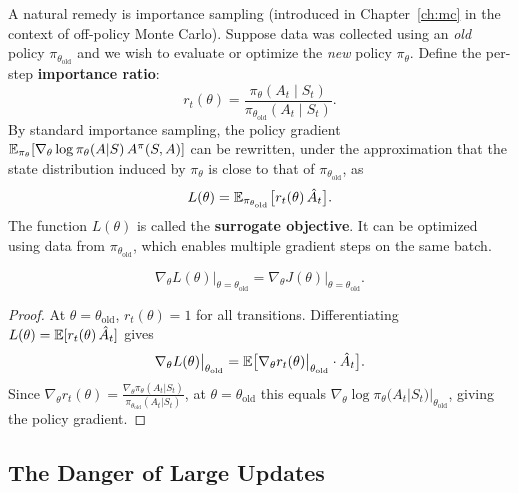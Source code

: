A natural remedy is importance sampling (introduced in Chapter~\ref{ch:mc}
in the context of off-policy Monte Carlo).  Suppose data was collected using
an \emph{old} policy $\pi_{\theta_\mathrm{old}}$ and we wish to evaluate or
optimize the \emph{new} policy $\pi_\theta$.  Define the per-step
\textbf{importance ratio}:
\begin{equation}
\label{eq:importance-ratio}
r_t(\theta)
= \frac{\pi_\theta(A_t \mid S_t)}{\pi_{\theta_\mathrm{old}}(A_t \mid S_t)}.
\end{equation}
By standard importance sampling, the policy gradient
$\operatorname{\mathbb{E}}_{\pi_\theta}[\nabla_\theta \log\pi_\theta(A|S)\,A^\pi(S,A)]$ can be
rewritten, under the approximation that the state distribution induced by
$\pi_\theta$ is close to that of $\pi_{\theta_\mathrm{old}}$, as
\begin{equation}
\label{eq:surrogate-obj}
L(\theta) = \operatorname{\mathbb{E}}_{\pi_{\theta_\mathrm{old}}}\bigl[r_t(\theta)\,\hat{A}_t\bigr].
\end{equation}
The function $L(\theta)$ is called the \textbf{surrogate objective}.
It can be optimized using data from $\pi_{\theta_\mathrm{old}}$, which
enables multiple gradient steps on the same batch.

\begin{proposition}
\label{prop:surrogate-gradient}
\begin{equation}
\label{eq:surrogate-gradient}
\nabla_\theta L(\theta)\big|_{\theta = \theta_\mathrm{old}}
= \nabla_\theta J(\theta)\big|_{\theta = \theta_\mathrm{old}}.
\end{equation}
\end{proposition}

\begin{proof}
At $\theta = \theta_\mathrm{old}$, $r_t(\theta) = 1$ for all transitions.
Differentiating $L(\theta) = \operatorname{\mathbb{E}}[r_t(\theta)\,\hat{A}_t]$ gives
\[
\nabla_\theta L(\theta)\big|_{\theta_\mathrm{old}}
= \operatorname{\mathbb{E}}\bigl[\nabla_\theta r_t(\theta)\big|_{\theta_\mathrm{old}}\cdot \hat{A}_t\bigr].
\]
Since $\nabla_\theta r_t(\theta) =
\frac{\nabla_\theta \pi_\theta(A_t|S_t)}{\pi_{\theta_\mathrm{old}}(A_t|S_t)}$,
at $\theta = \theta_\mathrm{old}$ this equals
$\nabla_\theta \log \pi_\theta(A_t|S_t)|_{\theta_\mathrm{old}}$,
giving the policy gradient.
\end{proof}

\subsection{The Danger of Large Updates}


